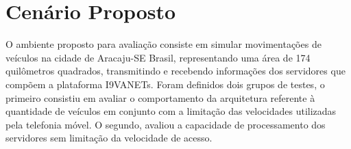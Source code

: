 \documentclass[
	12pt,				%
	oneside,			%
	a4paper,			%
	english,			%
	brazil				%
	]{abntex2ppgsi}
\begin{document}
		

\section{Cenário Proposto}

O ambiente proposto para avaliação consiste em simular movimentações de veículos na cidade de Aracaju-SE Brasil, representando uma área de 174 quilômetros quadrados, transmitindo e recebendo informações dos servidores que compõem a plataforma I9VANETs. Foram definidos dois grupos de testes, o primeiro consistiu em avaliar o comportamento da arquitetura referente à quantidade de veículos em conjunto com a limitação das velocidades utilizadas pela telefonia móvel. O segundo, avaliou a capacidade de processamento dos servidores sem limitação da velocidade de acesso.
\end{document}
